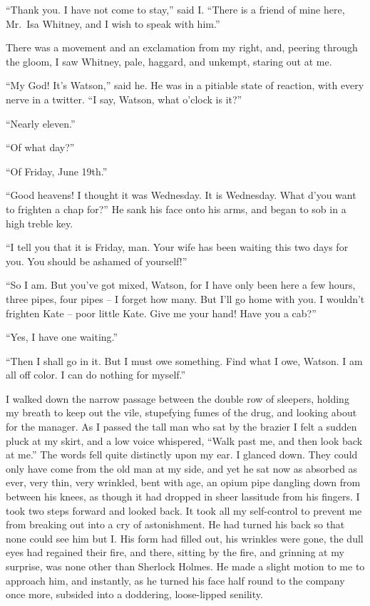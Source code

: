 “Thank you. I have not come to stay,” said I. “There
is a friend of mine here, Mr.~Isa Whitney, and I wish to speak
with him.”

There was a movement and an exclamation from my right,
and, peering through the gloom, I saw Whitney, pale, haggard,
and unkempt, staring out at me.

“My God! It’s Watson,” said he. He was in a pitiable
state of reaction, with every nerve in a twitter. “I say, Watson,
what o’clock is it?”

“Nearly eleven.”

“Of what day?”

“Of Friday, June 19th.”

“Good heavens! I thought it was Wednesday. It is Wednesday.
What d’you want to frighten a chap for?” He sank
his face onto his arms, and began to sob in a high treble key.

“I tell you that it is Friday, man. Your wife has been
waiting this two days for you. You should be ashamed of
yourself!”

“So I am. But you’ve got mixed, Watson, for I have only
been here a few hours, three pipes, four pipes -- I forget how
many. But I’ll go home with you. I wouldn’t frighten Kate -- poor
little Kate. Give me your hand! Have you a cab?”

“Yes, I have one waiting.”

“Then I shall go in it. But I must owe something. Find
what I owe, Watson. I am all off color. I can do nothing
for myself.”

I walked down the narrow passage between the double row
of sleepers, holding my breath to keep out the vile, stupefying
fumes of the drug, and looking about for the manager. As I
passed the tall man who sat by the brazier I felt a sudden
pluck at my skirt, and a low voice whispered, “Walk past me,
and then look back at me.” The words fell quite distinctly
upon my ear. I glanced down. They could only have come
from the old man at my side, and yet he sat now as absorbed
as ever, very thin, very wrinkled, bent with age, an opium pipe
dangling down from between his knees, as though it had
dropped in sheer lassitude from his fingers. I took two steps
forward and looked back. It took all my self-control to prevent
me from breaking out into a cry of astonishment. He
had turned his back so that none could see him but I. His
form had filled out, his wrinkles were gone, the dull eyes had
regained their fire, and there, sitting by the fire, and grinning
at my surprise, was none other than Sherlock Holmes. He
made a slight motion to me to approach him, and instantly,
as he turned his face half round to the company once more,
subsided into a doddering, loose-lipped senility.

